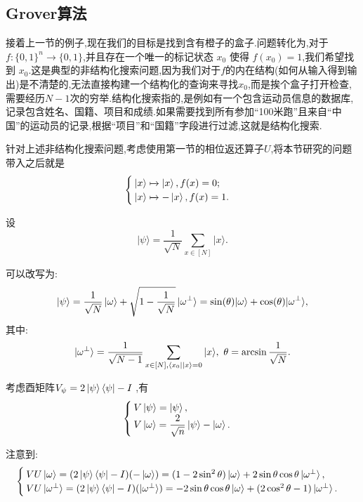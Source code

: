 \subsection{Grover算法}
接着上一节的例子,现在我们的目标是找到含有橙子的盒子.问题转化为,对于 $ f : \{0, 1\}^n \rightarrow \{0, 1\} $,并且存在一个唯一的标记状态 $ x_0 $ 使得 $ f(x_0) = 1 $,我们希望找到 $ x_0 $.这是典型的非结构化搜索问题,因为我们对于$f$的内在结构(如何从输入得到输出)是不清楚的,无法直接构建一个结构化的查询来寻找$x_0$,而是挨个盒子打开检查,需要经历$N-1$次的穷举.结构化搜索指的,是例如有一个包含运动员信息的数据库,记录包含姓名、国籍、项目和成绩.如果需要找到所有参加“100米跑”且来自“中国”的运动员的记录,根据“项目”和“国籍”字段进行过滤,这就是结构化搜索.

针对上述非结构化搜索问题,考虑使用第一节的相位返还算子$U$,将本节研究的问题带入之后就是
\begin{equation}
\begin{cases}
\ket{x}  \xmapsto ~ \ket{x}, f(x)=0; \\
\ket{x}  \xmapsto ~ -\ket{x}, f(x)=1.
\end{cases}
\end{equation}

设
\begin{equation}
	\vert \psi \rangle = \frac{1}{\sqrt{N}} \sum_{x \in [N]} \vert x \rangle.
\end{equation}
 
 可以改写为:
\begin{equation}
 	\vert \psi \rangle =\dfrac{1}{\sqrt{N}}\ket{\omega}+\sqrt{1-\dfrac{1}{\sqrt{N}}}\ket{\omega^\bot}
 	= \sin(\theta) \vert \omega \rangle + \cos(\theta) \vert \omega^\bot \rangle ,
\end{equation}
 其中:
 $$
 \ket{\omega^\bot}=\frac{1}{\sqrt{N-1}} \sum_{x \in [N],\bra{x_0}\ket{x}=0} \vert x \rangle,~ \theta = \arcsin \frac{1}{\sqrt{N}}.
 $$
 
考虑酉矩阵$ V_\psi =  2 \ket{\psi}\bra{\psi} -I$ ,有
 $$
 \begin{cases}
 	V\ket{\psi} = \ket{\psi}, \\
 	V\ket{\omega} = \dfrac{2}{\sqrt{n}}\ket{\psi}-\ket{\omega}.
 \end{cases}
 $$
 
注意到:
\begin{equation}
 \begin{cases} 
 VU \ket{\omega}=(2 \ket{\psi}\bra{\psi} -I)(-\ket{\omega})=(1-2 \sin^2 \theta )\ket{\omega}+2 \sin \theta \cos \theta \ket{\omega^\bot},\\
 VU \ket{\omega^\bot}=(2 \ket{\psi}\bra{\psi} -I)(\ket{\omega^\bot})=-2 \sin \theta \cos \theta \ket{\omega}+(2 \cos^2 \theta - 1)\ket{\omega^\bot}.
 \end{cases}
\end{equation}
 
